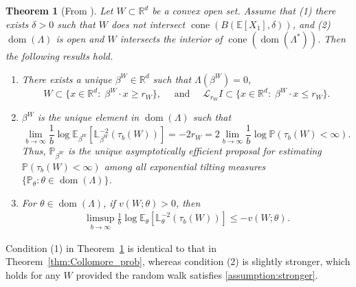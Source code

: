 \documentclass[aap,preprint]{imsart}
\newcommand{\Pro}{{\mathbb{P}}}
\newcommand{\Exp}{{\mathbb{E}}}
\newcommand{\bR}{{\mathbb{R}}}
\theoremstyle{plain}
\newtheorem{theorem}{Theorem}[section]
\theoremstyle{definition}
\begin{document}
\begin{theorem}[From \cite{collamore2002}]\label{thrm:Collamore_simulation}
Let $W \subset \mathbb{R}^d$ be a convex open set. 
 Assume  that (1) there exists  
 $\delta > 0$ such that $W$ does not intersect $\operatorname{cone}(B(\Exp[X_1], \delta))$, and (2)
 $\operatorname{dom}(\Lambda)$ is open  and 
  $W$ intersects   the interior of $\operatorname{cone}(\operatorname{dom}(\Lambda^*))$. Then the following results hold.
  
\begin{enumerate}[label=(\roman*)]
    \item There exists a unique $\beta^{W} \in \bR^d$ such that
    $\Lambda(\beta^{W}) = 0$, 
    $$
    W \subset \{x \in \bR^{d}: \; \beta^{W} \cdot x \geq r_{W}\}, \quad \text{ and } \quad 
    \mathcal{L}_{r_W} I  \subset \{x \in \bR^{d}: \; \beta^{W} \cdot x \leq r_{W} \}.
    $$
    \item $\beta^{W}$ is the unique element in $\operatorname{dom}(\Lambda)$ such that
$$
\lim_{b \to \infty} \frac{1}{b} \log \Exp_{\beta^{W}}\left[ 
\mathbb{L}_{\beta^{W}}^{-2}(\tau_b(W))
\right] = -2 r_W= 2  \lim_{b \to \infty} \frac{1}{b} \log \Pro(\tau_b(W) < \infty).
$$
Thus, 
 $\Pro_{\beta^W}$ is the unique asymptotically efficient proposal for estimating $\Pro\left( \tau_b(W) < \infty \right)$ among all exponential tilting measures $\{\Pro_{\theta} : \theta \in \operatorname{dom}(\Lambda)\}$.
\item For $\theta \in \operatorname{dom}(\Lambda)$, if  $v(W;\theta) > 0$, then
\begin{align*}
    \limsup_{b \to \infty} \frac{1}{b} \log \Exp_{\theta}\left[ 
\mathbb{L}_{\theta}^{-2}(\tau_b(W))
\right] \leq   - v(W;\theta).
\end{align*}
\end{enumerate}
\end{theorem}

Condition (1) in Theorem~\ref{thrm:Collamore_simulation} is identical to that in Theorem~\ref{thm:Collomore_prob}, whereas condition (2) is slightly stronger, which holds for any $W$ provided the random walk satisfies \eqref{assumption:stronger}.
\end{document}
